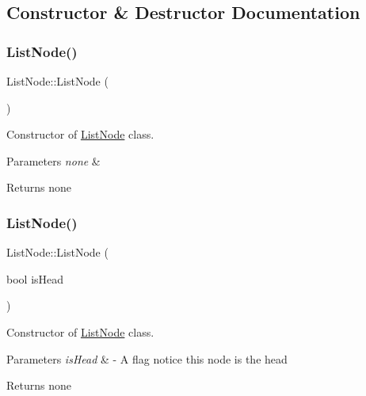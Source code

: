 \subsection{Constructor \& Destructor Documentation}
\mbox{\label{class_list_node_ac8e8674ba4da13a5074bfdf49471c585}} 
\subsubsection{\texorpdfstring{List\+Node()}{ListNode()}\hspace{0.1cm}{\footnotesize\ttfamily [1/2]}}
{\footnotesize\ttfamily List\+Node\+::\+List\+Node (\begin{DoxyParamCaption}{ }\end{DoxyParamCaption})}



Constructor of \hyperlink{class_list_node}{List\+Node} class. 


\begin{DoxyParams}{Parameters}
{\em none} & \\
\hline
\end{DoxyParams}
\begin{DoxyReturn}{Returns}
none 
\end{DoxyReturn}
\mbox{\label{class_list_node_a40fa34640e78f3d0bcb576feb52edcaf}} 
\subsubsection{\texorpdfstring{List\+Node()}{ListNode()}\hspace{0.1cm}{\footnotesize\ttfamily [2/2]}}
{\footnotesize\ttfamily List\+Node\+::\+List\+Node (\begin{DoxyParamCaption}\item[{bool}]{is\+Head }\end{DoxyParamCaption})}



Constructor of \hyperlink{class_list_node}{List\+Node} class. 


\begin{DoxyParams}{Parameters}
{\em is\+Head} & -\/ A flag notice this node is the head \\
\hline
\end{DoxyParams}
\begin{DoxyReturn}{Returns}
none 
\end{DoxyReturn}


